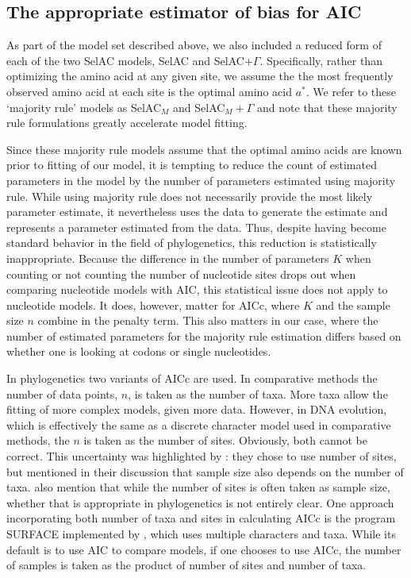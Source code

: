 \documentclass[onecolumn,letterpaper,fleqn,nogrid]{myMBE}%
\newcommand{\selac}{SelAC\xspace}
\newcommand{\selacplusgamma}{SelAC$+\Gamma$\xspace}
\newcommand{\selacmaj}{SelAC$_{M}$\xspace}
\newcommand{\selacmajplusgamma}{SelAC$_{M}+\Gamma$\xspace}
\newcommand{\aopt}{\ensuremath{a^*}\xspace}
\begin{document}
\subsection{The appropriate estimator of bias for AIC}
As part of the model set described above, we also included a reduced form of each of the two \selac models, \selac and \selacplusgamma.
Specifically, rather than optimizing the amino acid at any given site, we assume the  the most frequently observed amino acid at each site is the optimal amino acid \aopt.
We refer to these `majority rule' models as \selacmaj and \selacmajplusgamma and note that these majority rule formulations greatly accelerate model fitting.

Since these majority rule models assume that the optimal amino acids are known prior to fitting of our model, it is tempting to reduce the count of estimated parameters in the model by the number of parameters estimated using majority rule.
While using majority rule does not necessarily provide the most likely parameter estimate, it nevertheless uses the data to generate the estimate and represents a parameter estimated from the data.
Thus, despite having become standard behavior in the field of phylogenetics, this reduction is statistically inappropriate. %
Because the difference in the number of parameters $K$ when counting or not counting the number of nucleotide sites drops out when comparing nucleotide models with AIC, this statistical issue does not apply to nucleotide models.
It does, however, matter for AICc, where $K$ and the sample size $n$ combine in the penalty term.
This also matters in our case, where the number of estimated parameters for the majority rule estimation differs based on whether one is looking at codons or single nucleotides.

In phylogenetics two variants of AICc are used.
In comparative methods \citep[e.g.~][]{ButlerKing2004, OMearaetal2006, BeaulieuEtAl2013} the number of data points, $n$, is taken as the number of taxa.
More taxa allow the fitting of more complex models, given more data.
However, in DNA evolution, which is effectively the same as a discrete character model used in comparative methods, the $n$ is taken as the number of sites.
Obviously, both cannot be correct.
This uncertainty was highlighted by \citet{posadaBuckley2004}: they chose to use number of sites, but mentioned in their discussion that sample size also depends on the number of taxa.
\citet{SullivanJoyce2005} also mention that while the number of sites is often taken as sample size,  whether that is appropriate in phylogenetics is not entirely clear.
One approach incorporating both number of taxa and sites in calculating AICc is the program SURFACE implemented by \citet{IngramMahler2013}, which uses multiple characters and taxa.
While its default is to use AIC to compare models, if one chooses to use AICc, the number of samples is taken as the product of number of sites and number of taxa.
\end{document}

